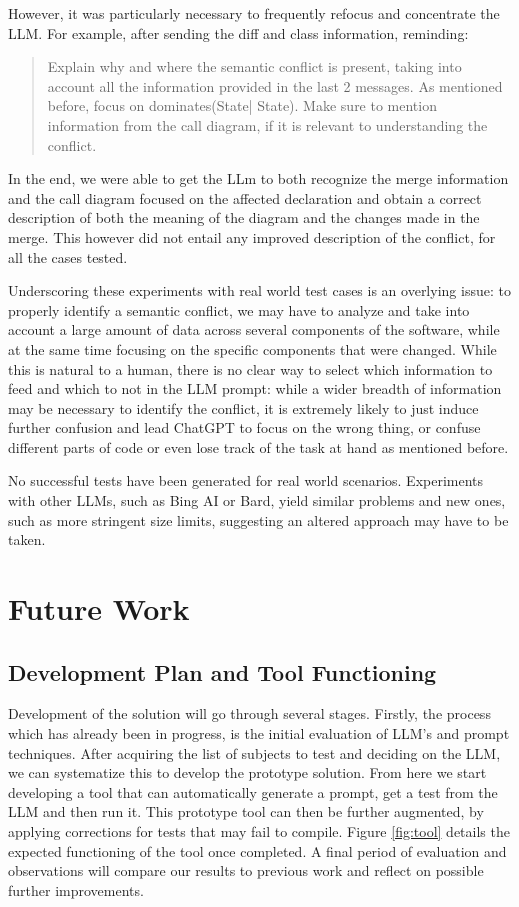 However, it was particularly necessary to frequently refocus and concentrate the LLM. For example, after sending the diff and class information, reminding:

\begin{quote}
Explain why and where the semantic conflict is present, taking into account all the information provided in the last 2 messages. As mentioned before, focus on dominates(State| State). Make sure to mention information from the call diagram, if it is relevant to understanding the conflict.
\end{quote}

In the end, we were able to get the LLm to both recognize the merge information and the call diagram focused on the affected declaration and obtain a correct description of both the meaning of the diagram and the changes made in the merge. This however did not entail any improved description of the conflict, for all the cases tested.

Underscoring these experiments with real world test cases is an overlying issue: to properly identify a semantic conflict, we may have to analyze and take into account a large amount of data across several components of the software, while at the same time focusing on the specific components that were changed. While this is natural to a human, there is no clear way to select which information to feed and which to not in the LLM prompt: while a wider breadth of information may be necessary to identify the conflict, it is extremely likely to just induce further confusion and lead ChatGPT to focus on the wrong thing, or confuse different parts of code or even lose track of the task at hand as mentioned before.

No successful tests have been generated for real world scenarios.
Experiments with other LLMs, such as Bing AI or Bard, yield similar problems and new ones, such as more stringent size limits, suggesting an altered approach may have to be taken.



\section{Future Work}

\subsection{Development Plan and Tool Functioning}

Development of the solution will go through several stages. Firstly, the process which has already been in progress, is the initial evaluation of LLM's and prompt techniques. After acquiring the list of subjects to test and deciding on the LLM, we can systematize this to develop the prototype solution. From here we start developing a tool that can automatically generate a prompt, get a test from the LLM and then run it. This prototype tool can then be further augmented, by applying corrections for tests that may fail to compile. Figure \ref{fig:tool} details the expected functioning of the tool once completed. A final period of evaluation and observations will compare our results to previous work and reflect on possible further improvements.


